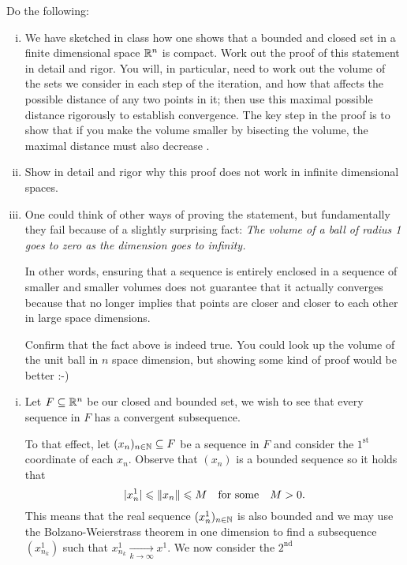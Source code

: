 \documentclass[12pt]{memoir}
\begin{document}
\begin{Ej}[Compactness]
    Do the following:
    \begin{enumerate}[i)]
        \itemsep=-0.4em
        \item We have sketched in class how one shows that a bounded and closed set in a finite dimensional space
        $\mathbb{R}^n$ is compact.  Work out the proof of this statement in detail and rigor. You
        will, in particular, need to work out the volume of the sets we consider in each step of the iteration, and
        how that affects the possible distance of any two points in it; then use this maximal possible distance
        rigorously to establish convergence. The key step in the proof is to show that if you make the volume
        smaller by bisecting the volume, the maximal distance must also decrease .
        \item Show in detail and rigor why this proof does not work in infinite dimensional spaces.
        \item One could think of other ways of proving the statement, but fundamentally they fail because of a
        slightly surprising fact: \emph{The volume of a ball of radius 1 goes to zero as the dimension goes to infinity.}\par
        In other words, ensuring that a sequence is entirely enclosed in a sequence of smaller and smaller
        volumes does not guarantee that it actually converges because that no longer implies that points are
        closer and closer to each other in large space dimensions.\par
        Confirm that the fact above is indeed true. You could look up the volume of the unit ball in $n$ space
dimension, but showing some kind of proof would be better :-)
    \end{enumerate}
\end{Ej}

\begin{ptcbr}
    \begin{enumerate}[i)]
        \item Let $F\subseteq\mathbb{R}^n$ be our closed and bounded set, we wish to see that every sequence in $F$ has a convergent subsequence.\par 
        To that effect, let $(x_n)_{n\in\mathbb{N}}\subseteq F$ be a sequence in $F$ and consider the $1^{\text{st}}$ coordinate of each $x_n$. Observe that $(x_n)$ is a bounded sequence so it holds that 
        $$|x^1_n|\leqslant\norm{x_n}\leqslant M\quad\text{for some}\quad M>0.$$
        This means that the real sequence $(x^1_n)_{n\in\mathbb{N}}$ is also bounded and we may use the Bolzano-Weierstrass theorem in one dimension to find a subsequence $(x^1_{n_k})$ such that $x^1_{n_k}\xrightarrow[k\to\infty]{}x^1$. We now consider the $2^{\text{nd}}$
    \end{enumerate}
\end{ptcbr}
\end{document}
